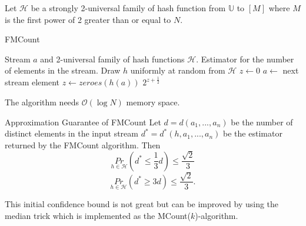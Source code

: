 \documentclass[english]{panikzettel}
\begin{document}
Let $\mathcal{H}$ be a strongly 2-universal family of hash function from $\mathbb{U}$ to $[M]$ where $M$ is the first power of 2 greater than or equal to $N$.

\begin{halfboxl}
\vspace{-\baselineskip}

	\begin{algo}{FMCount}
	{
	\renewcommand{\algorithmicrequire}{\textbf{Input:}}
	\renewcommand{\algorithmicensure}{\textbf{Output:}}
	  \begin{algorithmic}[1]
	    \Require Stream $a$ and 2-universal family of hash functions $\mathcal{H}$.
 	    \Ensure Estimator for the number of elements in the stream.
      \State Draw $h$ uniformly at random from $\mathcal{H}$
	  \State $z\leftarrow 0$
	  	\State $a\leftarrow$ next stream element
	    \State $z\leftarrow zeroes(h(a))$
	    \EndIf
	  \EndWhile
	  \State \Return $2^{z+\frac{1}{2}}$
	  \end{algorithmic}
	}
	\end{algo}
	The algorithm needs $\mathcal{O}(\log N)$ memory space.
	
\end{halfboxl}
\begin{halfboxr}
\vspace{-\baselineskip}

	\begin{theo}{Approximation Guarantee of FMCount}
	Let $d=d(a_1,...,a_n)$ be the number of distinct elements in the input stream $d^*=d^*(h,a_1,...,a_n)$ be the estimator returned by the FMCount algorithm. Then
	\[
	\underset{h\in\mathcal{H}}{Pr} \left(d^*\leq \frac{1}{3}d\right) \leq \frac{\sqrt{2}}{3}
	\]
	\[
	\underset{h\in\mathcal{H}}{Pr}(d^* \geq 3d)\leq \frac{\sqrt{2}}{3}.
	\]
	\end{theo}
	
	This initial confidence bound is not great but can be improved by using the median trick which is implemented as the MCount($k$)-algorithm.
\end{halfboxr}
\end{document}
